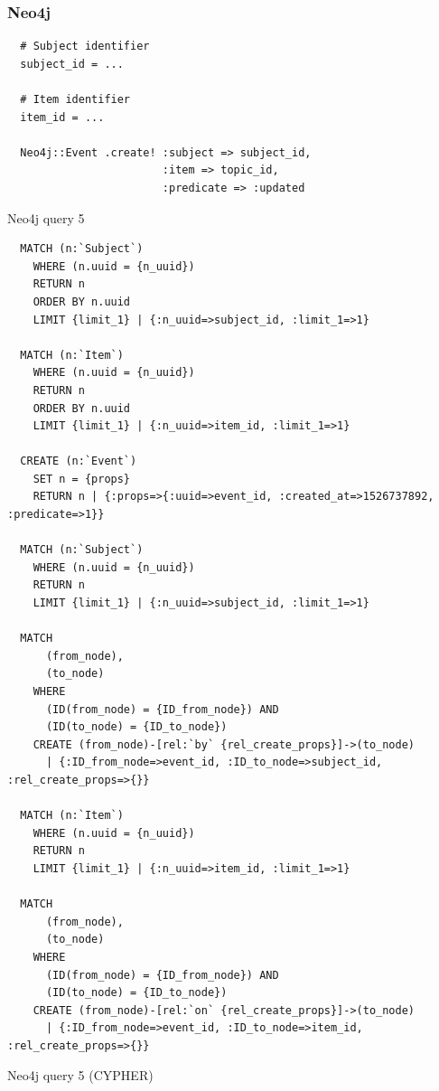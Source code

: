 \subsubsection*{Neo4j}

\begin{listing}[H]
  \begin{verbatim}
  # Subject identifier
  subject_id = ...

  # Item identifier
  item_id = ...

  Neo4j::Event .create! :subject => subject_id,
                        :item => topic_id,
                        :predicate => :updated
  \end{verbatim}

  \caption{Neo4j query 5}
  \label{lst:neo4j-query-5}
\end{listing}

\begin{listing}[H]
  \begin{verbatim}
  MATCH (n:`Subject`)
    WHERE (n.uuid = {n_uuid})
    RETURN n
    ORDER BY n.uuid
    LIMIT {limit_1} | {:n_uuid=>subject_id, :limit_1=>1}

  MATCH (n:`Item`)
    WHERE (n.uuid = {n_uuid})
    RETURN n
    ORDER BY n.uuid
    LIMIT {limit_1} | {:n_uuid=>item_id, :limit_1=>1}

  CREATE (n:`Event`)
    SET n = {props}
    RETURN n | {:props=>{:uuid=>event_id, :created_at=>1526737892, :predicate=>1}}

  MATCH (n:`Subject`)
    WHERE (n.uuid = {n_uuid})
    RETURN n
    LIMIT {limit_1} | {:n_uuid=>subject_id, :limit_1=>1}

  MATCH
      (from_node),
      (to_node)
    WHERE
      (ID(from_node) = {ID_from_node}) AND
      (ID(to_node) = {ID_to_node})
    CREATE (from_node)-[rel:`by` {rel_create_props}]->(to_node)
      | {:ID_from_node=>event_id, :ID_to_node=>subject_id, :rel_create_props=>{}}

  MATCH (n:`Item`)
    WHERE (n.uuid = {n_uuid})
    RETURN n
    LIMIT {limit_1} | {:n_uuid=>item_id, :limit_1=>1}

  MATCH
      (from_node),
      (to_node)
    WHERE
      (ID(from_node) = {ID_from_node}) AND
      (ID(to_node) = {ID_to_node})
    CREATE (from_node)-[rel:`on` {rel_create_props}]->(to_node)
      | {:ID_from_node=>event_id, :ID_to_node=>item_id, :rel_create_props=>{}}
  \end{verbatim}

  \caption{Neo4j query 5 (CYPHER)}
  \label{lst:neo4j-query-5-cypher}
\end{listing}

